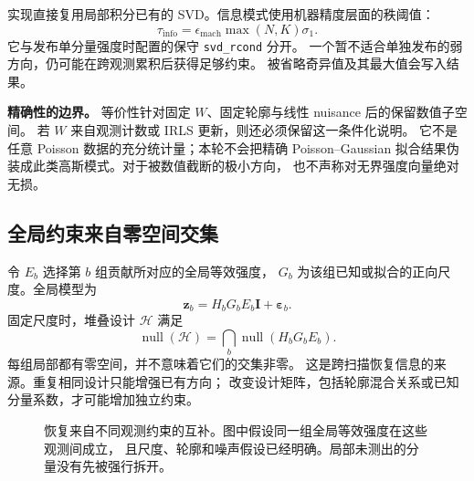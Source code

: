 \documentclass[UTF8,11pt,a4paper,fontset=fandol]{ctexart}
\newcommand{\Null}{\operatorname{null}}
\begin{document}
实现直接复用局部积分已有的 SVD。信息模式使用机器精度层面的秩阈值：
\begin{equation}
\tau_{\mathrm{info}}
=\epsilon_{\mathrm{mach}}\max(N,K)\sigma_1.
\end{equation}
它与发布单分量强度时配置的保守 \texttt{svd\_rcond} 分开。
一个暂不适合单独发布的弱方向，仍可能在跨观测累积后获得足够约束。
被省略奇异值及其最大值会写入结果。

\textbf{精确性的边界。}
等价性针对固定 $W$、固定轮廓与线性 nuisance 后的保留数值子空间。
若 $W$ 来自观测计数或 IRLS 更新，则还必须保留这一条件化说明。
它不是任意 Poisson 数据的充分统计量；本轮不会把精确 Poisson--Gaussian
拟合结果伪装成此类高斯模式。对于被数值截断的极小方向，
也不声称对无界强度向量绝对无损。

\subsection{全局约束来自零空间交集}

令 $E_b$ 选择第 $b$ 组贡献所对应的全局等效强度，
$G_b$ 为该组已知或拟合的正向尺度。全局模型为
\begin{equation}
\bm z_b=H_bG_bE_b\bm I+\bm\varepsilon_b.
\end{equation}
固定尺度时，堆叠设计 $\mathcal H$ 满足
\begin{equation}\label{eq:nullintersection}
\Null(\mathcal H)=
\bigcap_b\Null(H_bG_bE_b).
\end{equation}
每组局部都有零空间，并不意味着它们的交集非零。
这是跨扫描恢复信息的来源。重复相同设计只能增强已有方向；
改变设计矩阵，包括轮廓混合关系或已知分量系数，才可能增加独立约束。

\begin{figure}[htbp]
\centering
{}
\caption{恢复来自不同观测约束的互补。图中假设同一组全局等效强度在这些观测间成立，
且尺度、轮廓和噪声假设已经明确。局部未测出的分量没有先被强行拆开。}
\end{figure}
\end{document}
